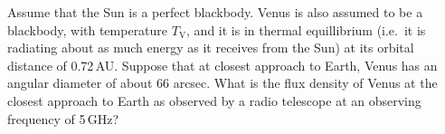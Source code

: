 Assume that the Sun is a perfect blackbody. Venus is also assumed to be a
blackbody, with temperature $T_{\mathrm{V}}$, and it is in thermal equillibrium
(i.e.\ it is radiating about as much energy as it receives from the Sun) at its
orbital distance of 0.72\,AU. Suppose that at closest approach to Earth, Venus
has an angular diameter of about 66 arcsec. What is the flux density of Venus
at the closest approach to Earth as observed by a radio telescope at an
observing frequency of 5\,GHz?
